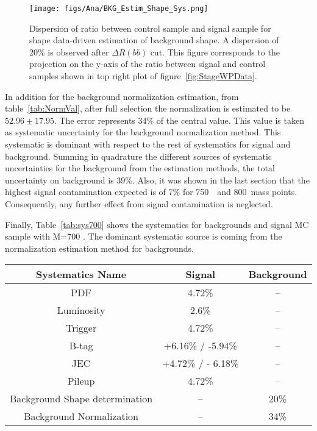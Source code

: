\begin{figure}[!Hhtbp]
  \begin{center}
    \texttt{[image: figs/Ana/BKG\_Estim\_Shape\_Sys.png]}
    \caption{Dispersion of ratio between control sample and signal sample for shape data-driven estimation of background shape. A dispersion of 20\% is observed after $\Delta R (bb)$ cut. This figure corresponds to the projection on the y-axis of the ratio between signal and control samples shown in top right plot of figure~\ref{fig:StageWPData}.}
    \label{fig:ShapeSys}
  \end{center}
\end{figure}

In addition for the background normalization estimation, from table~\ref{tab:NormVal}, after full selection the normalization is estimated to be $52.96\pm17.95$. The error represents 34\% of the central value. This value is taken as systematic uncertainty for the background normalization method. This systematic is dominant with respect to the rest of systematics for signal and background. Summing in quadrature the different sources of systematic uncertainties for the background from the estimation methods, the total uncertainty on background is 39\%. Also, it was shown in the last section that the highest signal contamination expected is of 7\% for 750~\GeVcc~and 800~\GeVcc mass points. Consequently, any further effect from signal contamination is neglected.

Finally, Table~\ref{tab:sys700} shows the systematics for backgrounds and signal MC sample with M=700 \GeVcc. The dominant systematic source is coming from the normalization estimation method for backgrounds.

\begin{table*}[htbH]
\begin{center}
\begin{tabular}{|c|c|c|}
\hline 
Systematics Name & Signal & Background \\
\hline
PDF & 4.72\% & --\\
Luminosity & 2.6\% & --\\
Trigger & 4.72\% & --\\
B-tag & +6.16\% / -5.94\% & --\\
JEC & +4.72\% / - 6.18\% & --\\
Pileup & 4.72\% & --\\
Background Shape determination & -- & 20\%\\
Background Normalization & -- & 34\%\\
\hline
\end{tabular}
\caption{Summary of uncertainties in the case of signal yield for the mass point at 700~GeV/$c^{2}$ and for background yields.\label{tab:sys700}}
\end{center}
\end{table*}


